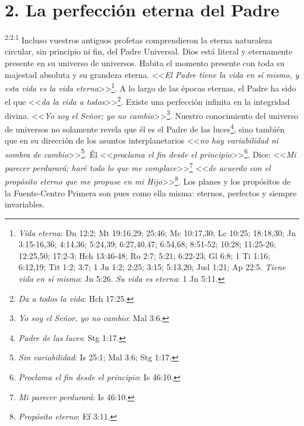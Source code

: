 \section*{2. La perfección eterna del Padre}
\par
\textsuperscript{2:2.1} Incluso vuestros antiguos profetas comprendieron la eterna naturaleza circular, sin principio ni fin, del Padre Universal. Dios está literal y eternamente presente en su universo de universos. Habita el momento presente con toda su majestad absoluta y su grandeza eterna. <<\textit{El Padre tiene la vida en sí mismo, y esta vida es la vida eterna}>>\footnote{\textit{Vida eterna}: Dn 12:2; Mt 19:16,29; 25:46; Mc 10:17,30; Lc 10:25; 18:18,30; Jn 3:15-16,36; 4:14,36; 5:24,39; 6:27,40,47; 6:54,68; 8:51-52; 10:28; 11:25-26; 12:25,50; 17:2-3; Hch 13:46-48; Ro 2:7; 5:21; 6:22-23; Gl 6:8; 1 Ti 1:16; 6:12,19; Tit 1:2; 3:7; 1 Jn 1:2; 2:25; 3:15; 5:13,20; Jud 1:21; Ap 22:5. \textit{Tiene vida en sí mismo}: Jn 5:26. \textit{Su vida es eterna}: 1 Jn 5:11.}. A lo largo de las épocas eternas, el Padre ha sido el que <<\textit{da la vida a todos}>>\footnote{\textit{Da a todos la vida}: Hch 17:25.}. Existe una perfección infinita en la integridad divina. <<\textit{Yo soy el Señor; yo no cambio}>>\footnote{\textit{Yo soy el Señor, yo no cambio}: Mal 3:6.}. Nuestro conocimiento del universo de universos no solamente revela que él es el Padre de las luces\footnote{\textit{Padre de las luces}: Stg 1:17.}, sino también que en su dirección de los asuntos interplanetarios <<\textit{no hay variabilidad ni sombra de cambio}>>\footnote{\textit{Sin variabilidad}: Is 25:1; Mal 3:6; Stg 1:17.}. Él <<\textit{proclama el fin desde el principio}>>\footnote{\textit{Proclama el fin desde el principio}: Is 46:10.}. Dice: <<\textit{Mi parecer perdurará; haré todo lo que me complace}>>\footnote{\textit{Mi parecer perdurará}: Is 46:10.} <<\textit{de acuerdo con el propósito eterno que me propuse en mi Hijo}>>\footnote{\textit{Propósito eterno}: Ef 3:11.}. Los planes y los propósitos de la Fuente-Centro Primera son pues como ella misma: eternos, perfectos y siempre invariables.

